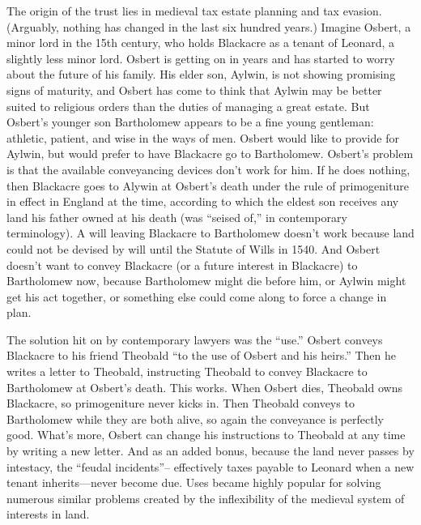 
The origin of the trust lies in medieval tax estate planning and tax evasion.
(Arguably, nothing has changed in the last six hundred years.) Imagine Osbert, a
minor lord in the 15th century, who holds Blackacre as a tenant of Leonard, a
slightly less minor lord. Osbert is getting on in years and has started to worry
about the future of his family. His elder son, Aylwin, is not showing promising
signs of maturity, and Osbert has come to think that Aylwin may be better suited
to religious orders than the duties of managing a great estate. But Osbert's
younger son Bartholomew appears to be a fine young gentleman: athletic, patient,
and wise in the ways of men. Osbert would like to provide for Aylwin, but would
prefer to have Blackacre go to Bartholomew. Osbert's problem is that the
available conveyancing devices don't work for him. If he does nothing, then
Blackacre goes to Alywin at Osbert's death under the rule of primogeniture in
effect in England at the time, according to which the eldest son receives any
land his father owned at his death (was ``seised of,'' in contemporary
terminology). A will leaving Blackacre to Bartholomew doesn't work because land
could not be devised by will until the Statute of Wills in 1540. And Osbert
doesn't want to convey Blackacre (or a future interest in Blackacre) to
Bartholomew now, because Bartholomew might die before him, or Aylwin might get
his act together, or something else could come along to force a change in plan.

The solution hit on by contemporary lawyers was the ``use.'' Osbert conveys
Blackacre to his friend Theobald ``to the use of Osbert and his heirs.'' Then he
writes a letter to Theobald, instructing Theobald to convey Blackacre to
Bartholomew at Osbert's death. This works. When Osbert dies, Theobald owns
Blackacre, so primogeniture never kicks in. Then Theobald conveys to Bartholomew
while they are both alive, so again the conveyance is perfectly good. What's
more, Osbert can change his instructions to Theobald at any time by writing a
new letter. And as an added bonus, because the land never passes by intestacy,
the ``feudal incidents''-- effectively taxes payable to Leonard when a new
tenant inherits---never become due. Uses became highly popular for solving
numerous similar problems created by the inflexibility of the medieval system of
interests in land.

